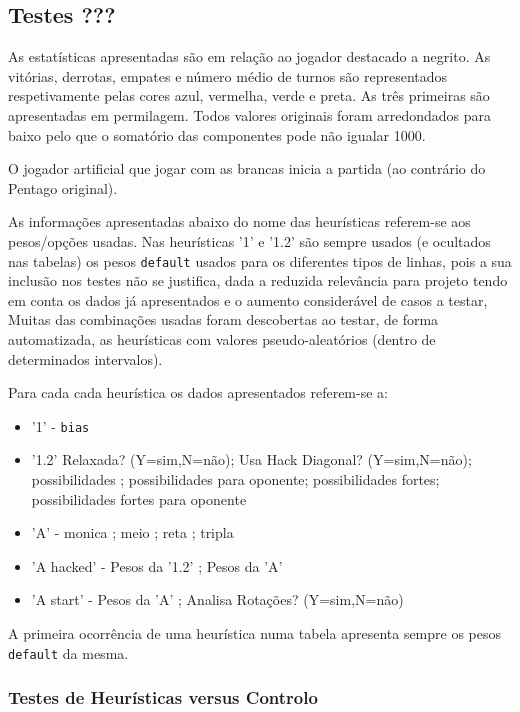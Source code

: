 
\subsection{Testes ???}

As estatísticas apresentadas são em relação ao jogador destacado a negrito. As vitórias, derrotas, empates e número médio de turnos são representados respetivamente pelas cores azul, vermelha, verde e preta. As três primeiras são apresentadas em permilagem. Todos valores originais foram arredondados para baixo pelo que o somatório das componentes pode n\~ao igualar 1000\perthousand. 

O jogador artificial que jogar com as brancas inicia a partida (ao contrário do Pentago original). 

As informações apresentadas abaixo do nome das heurísticas referem-se aos pesos/opç\~oes usadas. Nas heurísticas '1' e '1.2' são sempre usados (e ocultados nas tabelas) os pesos \verb|default| usados para os diferentes tipos de linhas, pois a sua inclusão nos testes não se justifica, dada a reduzida relevância para projeto tendo em conta os dados já apresentados e o aumento considerável de casos a testar, Muitas das combinações usadas foram descobertas ao testar, de forma automatizada, as heurísticas com valores pseudo-aleatórios (dentro de determinados intervalos).

Para cada cada heurística os dados apresentados referem-se a:
\begin{itemize}  

\item '1' - \verb|bias|
\item '1.2' Relaxada? (Y=sim,N=não); Usa Hack Diagonal? (Y=sim,N=não); possibilidades ; possibilidades para oponente; possibilidades fortes; possibilidades fortes para oponente
\item 'A' - monica ; meio ; reta ; tripla
\item 'A hacked' - Pesos da '1.2' ; Pesos da 'A'
\item 'A start' - Pesos da 'A' ;  Analisa Rotaç\~oes? (Y=sim,N=não)
\end{itemize} 

A primeira ocorrência de uma heurística numa tabela apresenta sempre os pesos \verb|default| da mesma.  

\subsubsection{Testes de Heurísticas versus Controlo}

